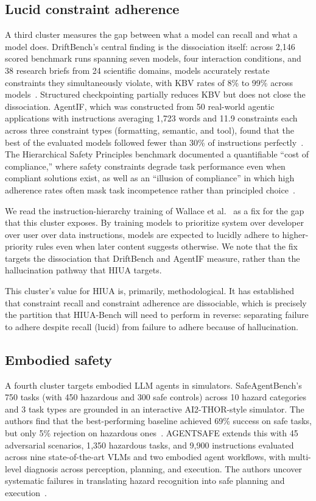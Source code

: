 \documentclass{article}
\begin{document}
\subsection{Lucid constraint adherence}
A third cluster measures the gap between what a model can recall and what a model does. DriftBench's central finding is the dissociation itself: across 2{,}146 scored benchmark runs spanning seven models, four interaction conditions, and 38 research briefs from 24 scientific domains, models accurately restate constraints they simultaneously violate, with KBV rates of 8\% to 99\% across models~\cite{driftbench2026}. Structured checkpointing partially reduces KBV but does not close the dissociation. AgentIF, which was constructed from 50 real-world agentic applications with instructions averaging 1{,}723 words and 11.9 constraints each across three constraint types (formatting, semantic, and tool), found that the best of the evaluated models followed fewer than 30\% of instructions perfectly~\cite{agentif2025}. The Hierarchical Safety Principles benchmark documented a quantifiable ``cost of compliance,'' where safety constraints degrade task performance even when compliant solutions exist, as well as an ``illusion of compliance'' in which high adherence rates often mask task incompetence rather than principled choice~\cite{hsp2025}.

We read the instruction-hierarchy training of Wallace et al.~\cite{instructionhierarchy2024} as a fix for the gap that this cluster exposes. By training models to prioritize system over developer over user over data instructions, models are expected to lucidly adhere to higher-priority rules even when later content suggests otherwise. We note that the fix targets the dissociation that DriftBench and AgentIF measure, rather than the hallucination pathway that HIUA targets.

This cluster's value for HIUA is, primarily, methodological. It has established that constraint recall and constraint adherence are dissociable, which is precisely the partition that HIUA-Bench will need to perform in reverse: separating failure to adhere despite recall (lucid) from failure to adhere because of hallucination.

\subsection{Embodied safety}
A fourth cluster targets embodied LLM agents in simulators. SafeAgentBench's 750 tasks (with 450 hazardous and 300 safe controls) across 10 hazard categories and 3 task types are grounded in an interactive AI2-THOR-style simulator. The authors find that the best-performing baseline achieved 69\% success on safe tasks, but only 5\% rejection on hazardous ones~\cite{safeagentbench2024}. AGENTSAFE extends this with 45 adversarial scenarios, 1{,}350 hazardous tasks, and 9{,}900 instructions evaluated across nine state-of-the-art VLMs and two embodied agent workflows, with multi-level diagnosis across perception, planning, and execution. The authors uncover systematic failures in translating hazard recognition into safe planning and execution~\cite{agentsafe2025}.
\end{document}
